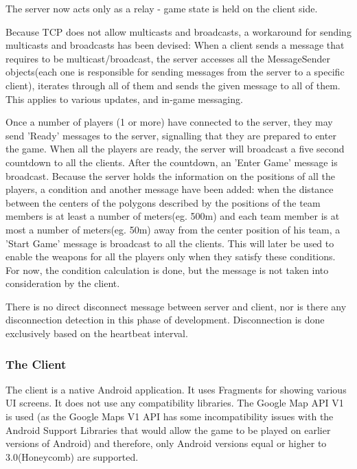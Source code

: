 The server now acts only as a relay - game state is held on the client
side.\newline

Because TCP does not allow multicasts and broadcasts, a workaround for sending
multicasts and broadcasts has been devised: When a client sends a message that
requires to be multicast/broadcast, the server accesses all the MessageSender
objects(each one is responsible for sending messages from the server to a
specific client), iterates through all of them and sends the given message to
all of them. This applies to various updates, and in-game messaging.\newline

Once a number of players (1 or more) have connected to the server, they may send
'Ready' messages to the server, signalling that they are prepared to enter the
game. When all the players are ready, the server will broadcast a five second
countdown to all the clients. After the countdown, an 'Enter Game' message is
broadcast. Because the server holds the information on the positions of all the
players, a condition and another message have been added: when the distance
between the centers of the polygons described by the positions of the
team members is at least a number of meters(eg. 500m) and each team member is at
most a number of meters(eg. 50m) away from the center position of his team, a
'Start Game' message is broadcast to all the clients. This will later be used to
enable the weapons for all the players only when they satisfy these
conditions. For now, the condition calculation is done, but the message
is not taken into consideration by the client.\newline

There is no direct disconnect message between server and client, nor is there
any disconnection detection in this phase of development. Disconnection is done
exclusively based on the heartbeat interval.\newline

\subsubsection{The Client}

The client is a native Android application. It uses Fragments for showing
various UI screens. It does not use any compatibility libraries. The Google Map
API V1 is used (as the Google Maps V1 API has some incompatibility issues with
the Android Support Libraries that would allow the game to be played on earlier
versions of Android) and therefore, only Android versions equal or higher to
3.0(Honeycomb) are supported.

